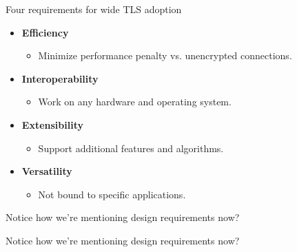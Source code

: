 \documentclass[aspectratio=169, lualatex, handout]{beamer}
\begin{document}
\begin{frame}{Four requirements for wide TLS adoption}
	\begin{itemize}[<+->]
		\item \textbf{Efficiency}
		      \begin{itemize}
			      \item Minimize performance penalty vs. unencrypted connections.
		      \end{itemize}
		\item \textbf{Interoperability}
		      \begin{itemize}
			      \item Work on any hardware and operating system.
		      \end{itemize}
		\item \textbf{Extensibility}
		      \begin{itemize}
			      \item Support additional features and algorithms.
		      \end{itemize}
		\item \textbf{Versatility}
		      \begin{itemize}
			      \item Not bound to specific applications.
		      \end{itemize}
	\end{itemize}
\end{frame}

\begin{frame}{Notice how we're mentioning design requirements now?}
\end{frame}

\begin{frame}{Notice how we're mentioning design requirements now?}
	\begin{center}
	\end{center}
\end{frame}
\end{document}
